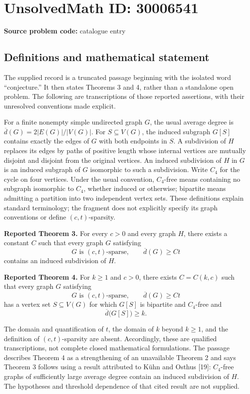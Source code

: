 \documentclass[11pt]{article}
\begin{document}
\section*{UnsolvedMath ID: 30006541}
\textbf{Source problem code:} catalogue entry
\subsection{Definitions and mathematical statement}
The supplied record is a truncated passage beginning with the isolated word ``conjecture.'' It then states Theorems 3 and 4, rather than a standalone open problem. The following are transcriptions of those reported assertions, with their unresolved conventions made explicit.

For a finite nonempty simple undirected graph \(G\), the usual average degree is \(\overline d(G)=2|E(G)|/|V(G)|\). For \(S\subseteq V(G)\), the induced subgraph \(G[S]\) contains exactly the edges of \(G\) with both endpoints in \(S\). A subdivision of \(H\) replaces its edges by paths of positive length whose internal vertices are mutually disjoint and disjoint from the original vertices. An induced subdivision of \(H\) in \(G\) is an induced subgraph of \(G\) isomorphic to such a subdivision. Write \(C_4\) for the cycle on four vertices. Under the usual convention, \(C_4\)-free means containing no subgraph isomorphic to \(C_4\), whether induced or otherwise; bipartite means admitting a partition into two independent vertex sets. These definitions explain standard terminology; the fragment does not explicitly specify its graph conventions or define \((c,t)\)-sparsity.

\textbf{Reported Theorem 3.} For every \(c>0\) and every graph \(H\), there exists a constant \(C\) such that every graph \(G\) satisfying
\[
G\text{ is }(c,t)\text{-sparse},\qquad \overline d(G)\ge Ct
\]
contains an induced subdivision of \(H\).

\textbf{Reported Theorem 4.} For \(k\ge1\) and \(c>0\), there exists \(C=C(k,c)\) such that every graph \(G\) satisfying
\[
G\text{ is }(c,t)\text{-sparse},\qquad \overline d(G)\ge Ct
\]
has a vertex set \(S\subseteq V(G)\) for which \(G[S]\) is bipartite and \(C_4\)-free and
\[
\overline d\bigl(G[S]\bigr)\ge k.
\]

The domain and quantification of \(t\), the domain of \(k\) beyond \(k\ge1\), and the definition of \((c,t)\)-sparsity are absent. Accordingly, these are qualified transcriptions, not complete closed mathematical formulations. The passage describes Theorem 4 as a strengthening of an unavailable Theorem 2 and says Theorem 3 follows using a result attributed to K\"uhn and Osthus [19]: \(C_4\)-free graphs of sufficiently large average degree contain an induced subdivision of \(H\). The hypotheses and threshold dependence of that cited result are not supplied.
\end{document}

